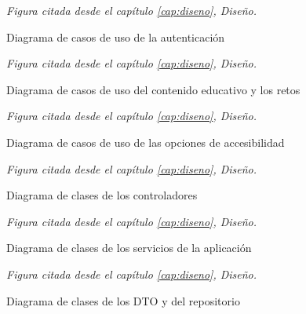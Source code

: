 \begin{figure}[H]
	\centerline{}
	\caption{Diagrama de casos de uso de la autenticación}
	\label{casos_uso_autenticacion}
	\par\smallskip\footnotesize\textit{Figura citada desde el capítulo \ref{cap:diseno}, Diseño.}
\end{figure}

\begin{figure}[H]
	\centerline{}
	\caption{Diagrama de casos de uso del contenido educativo y los retos}
	\label{casos_uso_educativo}
	\par\smallskip\footnotesize\textit{Figura citada desde el capítulo \ref{cap:diseno}, Diseño.}
\end{figure}

\begin{figure}[H]
	\centerline{}
	\caption{Diagrama de casos de uso de las opciones de accesibilidad}
	\label{casos_uso_accesibilidad}
	\par\smallskip\footnotesize\textit{Figura citada desde el capítulo \ref{cap:diseno}, Diseño.}
\end{figure}

\begin{figure}[H]
	\centerline{}
	\caption{Diagrama de clases de los controladores}
	\label{clases_controlador}
	\par\smallskip\footnotesize\textit{Figura citada desde el capítulo \ref{cap:diseno}, Diseño.}
\end{figure}

\begin{figure}[H]
	\centerline{}
	\caption{Diagrama de clases de los servicios de la aplicación}
	\label{clases_servicio}
	\par\smallskip\footnotesize\textit{Figura citada desde el capítulo \ref{cap:diseno}, Diseño.}
\end{figure}

\begin{figure}[H]
	\centerline{}
	\caption{Diagrama de clases de los DTO y del repositorio}
	\label{clases_dto}
	\par\smallskip\footnotesize\textit{Figura citada desde el capítulo \ref{cap:diseno}, Diseño.}
\end{figure}

